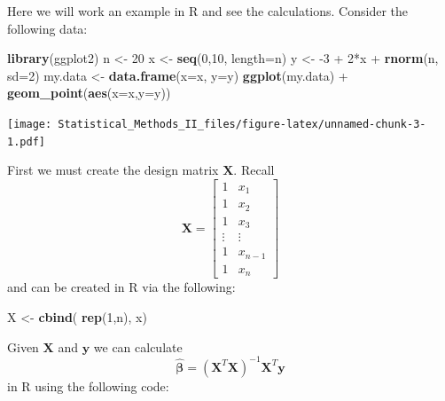 \documentclass[]{book}
\newenvironment{Shaded}{\begin{snugshade}}{\end{snugshade}}
\newcommand{\KeywordTok}[1]{\textcolor[rgb]{0.13,0.29,0.53}{\textbf{{#1}}}}
\newcommand{\DataTypeTok}[1]{\textcolor[rgb]{0.13,0.29,0.53}{{#1}}}
\newcommand{\DecValTok}[1]{\textcolor[rgb]{0.00,0.00,0.81}{{#1}}}
\newcommand{\StringTok}[1]{\textcolor[rgb]{0.31,0.60,0.02}{{#1}}}
\newcommand{\NormalTok}[1]{{#1}}
\theoremstyle{definition}
\theoremstyle{definition}
\theoremstyle{remark}
\begin{document}
Here we will work an example in R and see the calculations. Consider the
following data:

\begin{Shaded}
\begin{Highlighting}[]
\KeywordTok{library}\NormalTok{(ggplot2)}
\NormalTok{n <-}\StringTok{ }\DecValTok{20}
\NormalTok{x <-}\StringTok{ }\KeywordTok{seq}\NormalTok{(}\DecValTok{0}\NormalTok{,}\DecValTok{10}\NormalTok{, }\DataTypeTok{length=}\NormalTok{n)}
\NormalTok{y <-}\StringTok{ }\NormalTok{-}\DecValTok{3} \NormalTok{+}\StringTok{ }\DecValTok{2}\NormalTok{*x +}\StringTok{ }\KeywordTok{rnorm}\NormalTok{(n, }\DataTypeTok{sd=}\DecValTok{2}\NormalTok{)}
\NormalTok{my.data <-}\StringTok{ }\KeywordTok{data.frame}\NormalTok{(}\DataTypeTok{x=}\NormalTok{x, }\DataTypeTok{y=}\NormalTok{y)}
\KeywordTok{ggplot}\NormalTok{(my.data) +}\StringTok{ }\KeywordTok{geom_point}\NormalTok{(}\KeywordTok{aes}\NormalTok{(}\DataTypeTok{x=}\NormalTok{x,}\DataTypeTok{y=}\NormalTok{y))}
\end{Highlighting}
\end{Shaded}

\texttt{[image: Statistical\_Methods\_II\_files/figure-latex/unnamed-chunk-3-1.pdf]}

First we must create the design matrix \(\boldsymbol{X}\). Recall \[
\boldsymbol{X}=\left[\begin{array}{cc}
1 & x_{1}\\
1 & x_{2}\\
1 & x_{3}\\
\vdots & \vdots\\
1 & x_{n-1}\\
1 & x_{n}
\end{array}\right]
\] and can be created in R via the following:

\begin{Shaded}
\begin{Highlighting}[]
\NormalTok{X <-}\StringTok{ }\KeywordTok{cbind}\NormalTok{( }\KeywordTok{rep}\NormalTok{(}\DecValTok{1}\NormalTok{,n), x)}
\end{Highlighting}
\end{Shaded}

Given \(\boldsymbol{X}\) and \(\boldsymbol{y}\) we can calculate \[
\hat{\boldsymbol{\beta}}=\left(\boldsymbol{X}^{T}\boldsymbol{X}\right)^{-1}\boldsymbol{X}^{T}\boldsymbol{y}
\] in R using the following code:

\begin{Shaded}
\end{Shaded}
\end{document}
